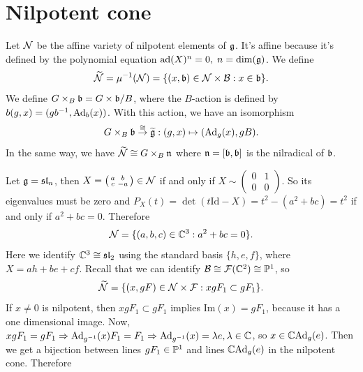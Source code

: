 \section{Nilpotent cone}
Let $\mathcal{N}$ be the affine variety of nilpotent elements of $\mathfrak{g}$. It's affine because it's 
defined by the polynomial equation $\text{ad}(X)^{n}=0,\;n=\dim(\mathfrak{g})$.
We define 
\begin{equation}
    \widetilde{\mathcal{N}} = \mu^{-1}(\mathcal{N}) = \{(x,\mathfrak{b})\in \mathcal{N}\times\mathcal{B}: x\in\mathfrak{b}\}.
\end{equation}
We define $G\times_{B}\mathfrak{b} = G\times \mathfrak{b} / B$, where the $B$-action is defined by 
$b(g,x) = (gb^{-1},\text{Ad}_b(x))$. With this action, we have an isomorphism 
\begin{equation}
    G\times_{B}\mathfrak{b} \overset{\cong}{\to}\widetilde{\mathfrak{g}}:(g,x)\mapsto (\text{Ad}_g(x),gB).
\end{equation}
In the same way, we have $\widetilde{\mathcal{N}} \cong G\times_B\mathfrak{n}$ where $\mathfrak{n}=[\mathfrak{b,\mathfrak{b}}]$ is the nilradical 
of $\mathfrak{b}$.

\begin{example}
    Let $\mathfrak{g}=\mathfrak{sl}_n$, then $X=\left(\begin{smallmatrix}a&b\\c&-a\end{smallmatrix}\right)\in\mathcal{N}$ 
    if and only if $X\sim\left(\begin{smallmatrix}0&1\\0&0\end{smallmatrix}\right)$. 
    So its eigenvalues must be zero and $P_X(t) = \det(t\text{Id}-X)=t^2-(a^2+bc)=t^2$ if and only if 
    $a^2+bc=0$. Therefore 
    \begin{equation}
        \mathcal{N} = \{(a,b,c)\in\mathbb{C}^3: a^2+bc= 0\}.
    \end{equation} 
    Here we identify $\mathbb{C}^3\cong \mathfrak{sl}_2$ using the standard basis $\{h,e,f\}$, where $X=ah + be + cf$. 
    Recall that we can identify $\mathcal{B}\cong \mathcal{F}(\mathbb{C}^2)\cong\mathbb{P}^1$, so 
    \begin{equation}
        \widetilde{\mathcal{N}} = \{(x,gF)\in\mathcal{N}\times\mathcal{F}: x gF_1\subset gF_1\}.
    \end{equation} 
    If $x\neq0$ is nilpotent, then $x gF_1\subset gF_1$ implies $\text{Im}(x) =gF_1$, because it has a one dimensional image.
    Now, $x gF_1 = gF_1\Rightarrow \text{Ad}_{g^{-1}}(x)F_1 = F_1\Rightarrow \text{Ad}_{g^{-1}}(x) = \lambda e,\lambda\in\mathbb{C}$, so 
    $x\in\mathbb{C}\text{Ad}_g(e)$. Then we get a bijection between lines $gF_1\in\mathbb{P}^1$ and lines $\mathbb{C}\text{Ad}_g(e)$ in the nilpotent cone. 
     Therefore 
     \begin{center}
     \end{center}
\end{example}

